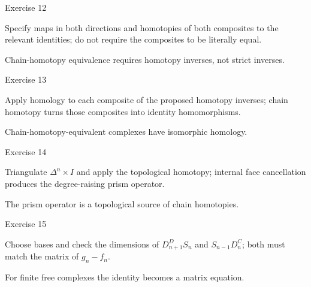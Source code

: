\begin{exercise}\label{exr:viii22-12}
Exercise 12
\end{exercise}
\begin{hint}
Specify maps in both directions and homotopies of both composites to the relevant identities; do not require the composites to be literally equal.
\end{hint}
\begin{solution}
Chain-homotopy equivalence requires homotopy inverses, not strict inverses.
\end{solution}

\begin{exercise}\label{exr:viii22-13}
Exercise 13
\end{exercise}
\begin{hint}
Apply homology to each composite of the proposed homotopy inverses; chain homotopy turns those composites into identity homomorphisms.
\end{hint}
\begin{solution}
Chain-homotopy-equivalent complexes have isomorphic homology.
\end{solution}

\begin{exercise}\label{exr:viii22-14}
Exercise 14
\end{exercise}
\begin{hint}
Triangulate \(\Delta^n\times I\) and apply the topological homotopy; internal face cancellation produces the degree-raising prism operator.
\end{hint}
\begin{solution}
The prism operator is a topological source of chain homotopies.
\end{solution}

\begin{exercise}\label{exr:viii22-15}
Exercise 15
\end{exercise}
\begin{hint}
Choose bases and check the dimensions of \(D^D_{n+1}S_n\) and \(S_{n-1}D^C_n\); both must match the matrix of \(g_n-f_n\).
\end{hint}
\begin{solution}
For finite free complexes the identity becomes a matrix equation.
\end{solution}

